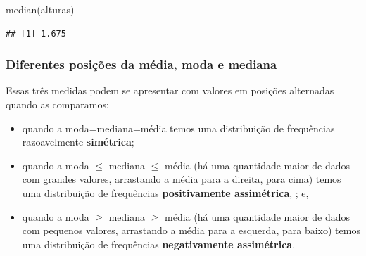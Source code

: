 \documentclass[
]{book}
\newenvironment{Shaded}{\begin{snugshade}}{\end{snugshade}}
\newcommand{\FunctionTok}[1]{\textcolor[rgb]{0.00,0.00,0.00}{#1}}
\newcommand{\NormalTok}[1]{#1}
\providecommand{\tightlist}{%
  \setlength{\itemsep}{0pt}\setlength{\parskip}{0pt}}
\begin{document}
\begin{Shaded}
\begin{Highlighting}[]
\FunctionTok{median}\NormalTok{(alturas)}
\end{Highlighting}
\end{Shaded}

\begin{verbatim}
## [1] 1.675
\end{verbatim}

\hfill\break

\hypertarget{diferentes-posiuxe7uxf5es-da-muxe9dia-moda-e-mediana}{%
\subsubsection{Diferentes posições da média, moda e mediana}\label{diferentes-posiuxe7uxf5es-da-muxe9dia-moda-e-mediana}}

\hfill\break

Essas três medidas podem se apresentar com valores em posições alternadas quando as comparamos:\\

\begin{itemize}
\tightlist
\item
  quando a moda=mediana=média temos uma distribuição de frequências razoavelmente \textbf{simétrica};
\item
  quando a moda \(\leq\) mediana \(\leq\) média (há uma quantidade maior de dados com grandes valores, arrastando a média para a direita, para cima) temos uma distribuição de frequências \textbf{positivamente assimétrica}, ; e,\\
\item
  quando a moda \(\geq\) mediana \(\geq\) média (há uma quantidade maior de dados com pequenos valores, arrastando a média para a esquerda, para baixo) temos uma distribuição de frequências \textbf{negativamente assimétrica}.
\end{itemize}

\hfill\break

\hfill\break
\end{document}
